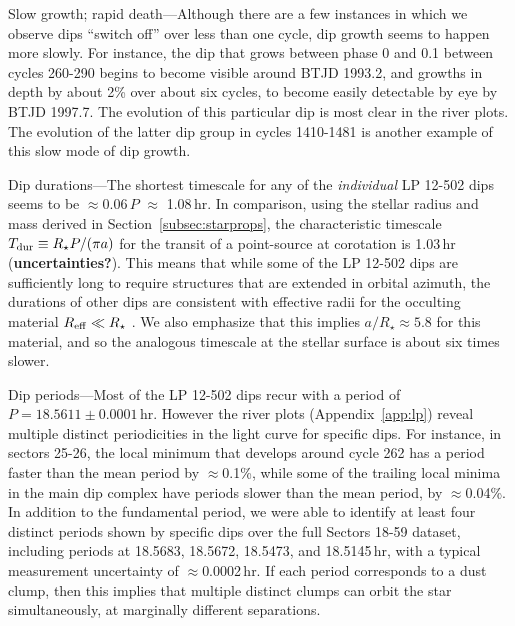 \documentclass[11pt,twocolumn,tighten]{aastex63}
\begin{document}
{\sc Slow growth; rapid death}---Although there are a
few instances in which we observe dips ``switch off'' over less
than one cycle, dip growth seems to happen more slowly.  For instance,
the dip that grows between phase 0 and 0.1 between cycles 260-290
begins to become visible around BTJD 1993.2, and growths in depth by
about 2\% over about six cycles, to become easily detectable by eye by
BTJD 1997.7.  The evolution of this particular dip is most clear in
the river plots.  The evolution of the latter dip group in cycles
1410-1481 is another example of this slow mode of dip growth.

{\sc Dip durations}---The shortest timescale for any of the {\it
individual} LP 12-502 dips seems to be $\approx$0.06\,$P$ $\approx$
1.08\,hr.  In comparison, using the stellar radius and mass derived in
Section~\ref{subsec:starprops}, the characteristic timescale $T_{\rm
dur} \equiv R_\star P / (\pi a)$ for the transit of a point-source at
corotation is 1.03\,hr ({\bf uncertainties?}).  This means that while
some of the LP 12-502 dips are sufficiently long to require structures
that are extended in orbital azimuth, the durations of other dips are
consistent with effective radii for the occulting material $R_{\rm
eff} \ll R_\star$ .
We also emphasize that this implies $a/R_\star \approx 5.8$ for this
material, and so the analogous timescale at the stellar surface is
about six times slower.

{\sc Dip periods}---Most of the LP 12-502 dips recur with a period of
$P=18.5611 \pm 0.0001$\,hr.  However the river plots
(Appendix~\ref{app:lp}) reveal multiple distinct periodicities in the
light curve for specific dips.  For instance, in sectors 25-26, the
local minimum that develops around cycle 262 has a period faster than
the mean period by $\approx$0.1\%, while some of the trailing local
minima in the main dip complex have periods slower than the mean
period, by $\approx$0.04\%.  In addition to the fundamental period, we
were able to identify at least four distinct periods shown by specific
dips over the full Sectors 18-59 dataset, including periods at
18.5683, 18.5672, 18.5473, and 18.5145\,hr, with a typical measurement
uncertainty of $\approx$0.0002\,hr.
If each period corresponds to a dust clump, then this implies that
multiple distinct clumps can orbit the star simultaneously, at
marginally different separations.
\end{document}
